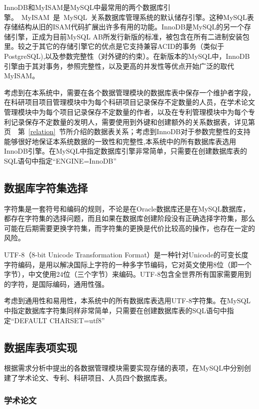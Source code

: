 InnoDB和MyISAM是MySQL中最常用的两个数据库引擎。~MyISAM~是~MySQL~关系数据库管理系统的默认储存引擎。这种MySQL表存储结构从旧的ISAM代码扩展出许多有用的功能。InnoDB是MySQL的另一个存储引擎，正成为目前MySQL AB所发行新版的标准，被包含在所有二进制安装包里。较之于其它的存储引擎它的优点是它支持兼容ACID的事务（类似于PostgreSQL),以及参数完整性（对外键的约束）。在新版本的MySQL中，InnoDB引擎由于其对事务，参照完整性，以及更高的并发性等优点开始广泛的取代MyISAM。

考虑到在本系统中，需要在各个数据管理模块的数据库表中保存一个维护者字段，在科研项目项目管理模块中为每个科研项目记录保存不定数量的人员，在学术论文管理模块中为每个项目记录保存不定数量的作者，以及在专利管理模块中为每个专利记录保存不定数量的发明人，需要使用到外键和创建额外的关系数据表，详见第页~\pageref{relation}~第~\ref{relation}~节所介绍的数据表关系；考虑到InnoDB对于参数完整性的支持能够很好地保证本系统数据的一致性和完整性,本系统中的所有数据库表选用InnoDB引擎。在MySQL中指定数据库引擎非常简单，只需要在创建数据库表的SQL语句中指定“ENGINE=InnoDB”

\subsection{数据库字符集选择}
\label{utf8}
字符集是一套符号和编码的规则，不论是在Oracle数据库还是在MySQL数据库，都存在字符集的选择问题，而且如果在数据库创建阶段没有正确选择字符集，那么可能在后期需要更换字符集，而字符集的更换是代价比较高的操作，也存在一定的风险。

UTF-8（8-bit Unicode Transformation Format）是一种针对Unicode的可变长度字符编码，是用以解决国际上字符的一种多字节编码，它对英文使用8位（即一个字节），中文使用24位（三个字节）来编码。UTF-8包含全世界所有国家需要用到的字符，是国际编码，通用性强。

考虑到通用性和易用性，本系统中的所有数据库表选用UTF-8字符集。在MySQL中指定数据库字符集同样非常简单，只需要在创建数据库表的SQL语句中指定“DEFAULT CHARSET=utf8”


\subsection{数据库表项实现}
根据需求分析中提出的各数据管理模块需要实现存储的表项，在MySQL中分别创建了学术论文、专利、科研项目、人员四个数据库表。

\subsubsection{学术论文}

